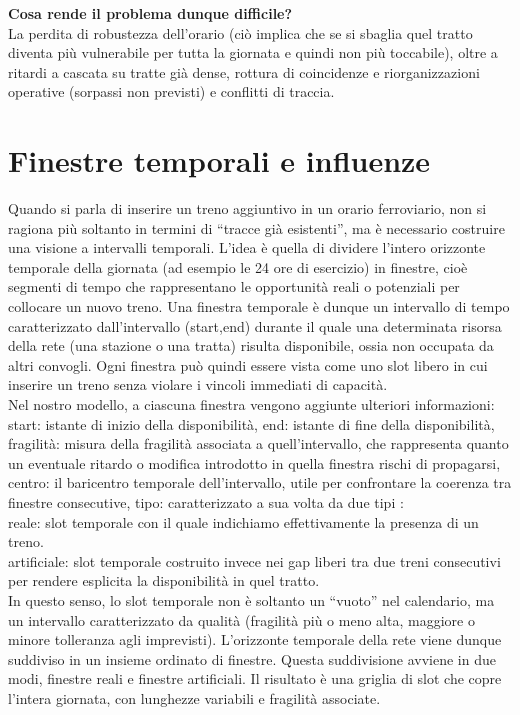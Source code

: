 \documentclass{report}
\begin{document}
\textbf{Cosa rende il problema dunque difficile?} \\
La perdita di robustezza dell’orario (ciò implica che se si sbaglia quel tratto diventa più vulnerabile per tutta la giornata e quindi non più toccabile), oltre a ritardi a cascata su tratte già dense, rottura di coincidenze e riorganizzazioni operative (sorpassi non previsti) e conflitti di traccia.





\section{Finestre temporali e influenze}

Quando si parla di inserire un treno aggiuntivo in un orario ferroviario, non si ragiona più soltanto in termini di “tracce già esistenti”, ma è necessario costruire una visione a intervalli temporali. 
L’idea è quella di dividere l’intero orizzonte temporale della giornata (ad esempio le 24 ore di esercizio) in finestre, cioè segmenti di tempo che rappresentano le opportunità reali o potenziali per collocare un nuovo treno. 
Una finestra temporale è dunque un intervallo di tempo caratterizzato dall'intervallo (start,end) durante il quale una determinata risorsa della rete (una stazione o una tratta) risulta disponibile, ossia non occupata da altri convogli. Ogni finestra può quindi essere vista come uno slot libero in cui inserire un treno senza violare i vincoli immediati di capacità.
\\ Nel nostro modello, a ciascuna finestra vengono aggiunte ulteriori informazioni:
 start: istante di inizio della disponibilità, end: istante di fine della disponibilità, fragilità: misura della fragilità associata a quell’intervallo, che rappresenta quanto un eventuale ritardo o modifica introdotto in quella finestra rischi di propagarsi, centro: il baricentro temporale dell’intervallo, utile per confrontare la coerenza tra finestre consecutive, tipo: caratterizzato a sua volta da due tipi : \\
  reale: slot temporale con il quale indichiamo effettivamente la presenza di un treno. \\
  artificiale: slot temporale costruito invece nei gap liberi tra due treni consecutivi per rendere esplicita la disponibilità in quel tratto. \\  In questo senso, lo slot temporale non è soltanto un “vuoto” nel calendario, ma un intervallo caratterizzato da qualità (fragilità più o meno alta, maggiore o minore tolleranza agli imprevisti).
L’orizzonte temporale della rete viene dunque suddiviso in un insieme ordinato di finestre. 
Questa suddivisione avviene in due modi, finestre reali e finestre artificiali.
Il risultato è una griglia di slot che copre l’intera giornata, con lunghezze variabili e fragilità associate.
\end{document}
